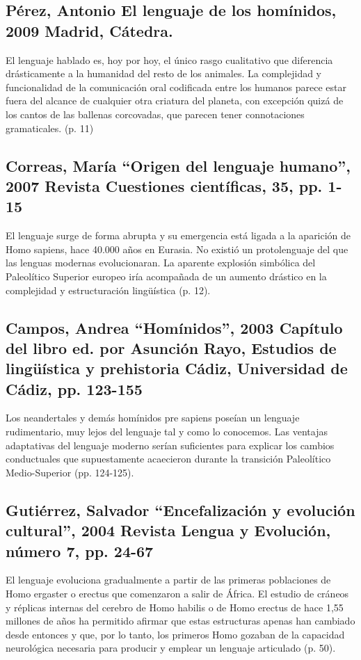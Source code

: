 \documentclass[12pt, a4paper, oneside]{report}
\begin{document}
                \subsection{Pérez, Antonio
                El lenguaje de los homínidos, 2009
                Madrid, Cátedra.}

                El lenguaje hablado es, hoy por hoy, el único rasgo cualitativo que diferencia drásticamente
                a la humanidad del resto de los animales. La complejidad y funcionalidad de la comunicación
                oral codificada entre los humanos parece estar fuera del alcance de cualquier otra criatura
                del planeta, con excepción quizá de los cantos de las ballenas corcovadas, que parecen tener
                connotaciones gramaticales. (p. 11)

                \subsection{Correas, María
                “Origen del lenguaje humano”, 2007
                Revista Cuestiones científicas, 35, pp. 1-15}

        El lenguaje surge de forma abrupta y su emergencia está ligada a la aparición de Homo sapiens, hace 40.000 años en Eurasia. No existió un protolenguaje del que las lenguas modernas evolucionaran. La aparente explosión simbólica del Paleolítico Superior europeo iría acompañada de un aumento drástico en la complejidad y estructuración lingüística (p. 12).
        \subsection{Campos, Andrea
        “Homínidos”, 2003
        Capítulo del libro ed. por Asunción Rayo, Estudios de lingüística y prehistoria
        Cádiz, Universidad de Cádiz, pp. 123-155}
        Los neandertales y demás homínidos pre sapiens poseían un lenguaje rudimentario, muy lejos del lenguaje tal y como lo conocemos. Las ventajas adaptativas del lenguaje moderno serían suficientes para explicar los cambios conductuales que supuestamente acaecieron durante la transición Paleolítico Medio-Superior (pp. 124-125).
        \subsection{Gutiérrez, Salvador
        “Encefalización y evolución cultural”, 2004
        Revista Lengua y Evolución, número 7, pp. 24-67}
        El lenguaje evoluciona gradualmente a partir de las primeras poblaciones de Homo ergaster o erectus que comenzaron a salir de África. El estudio de cráneos y réplicas internas del cerebro de Homo habilis o de Homo erectus de hace 1,55 millones de años ha permitido afirmar que estas estructuras apenas han cambiado desde entonces y que, por lo tanto, los primeros Homo gozaban de la capacidad neurológica necesaria para producir y emplear un lenguaje articulado (p. 50).
\end{document}
